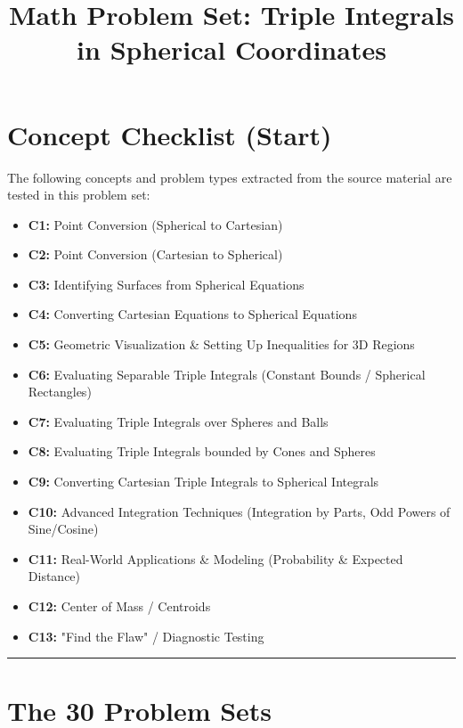\documentclass[11pt]{article}
\title{Math Problem Set: Triple Integrals in Spherical Coordinates}
\author{}
\date{}
\begin{document}
\maketitle

\section*{Concept Checklist (Start)}
The following concepts and problem types extracted from the source material are tested in this problem set:
\begin{itemize}
    \item \textbf{C1:} Point Conversion (Spherical to Cartesian)
    \item \textbf{C2:} Point Conversion (Cartesian to Spherical)
    \item \textbf{C3:} Identifying Surfaces from Spherical Equations
    \item \textbf{C4:} Converting Cartesian Equations to Spherical Equations
    \item \textbf{C5:} Geometric Visualization \& Setting Up Inequalities for 3D Regions
    \item \textbf{C6:} Evaluating Separable Triple Integrals (Constant Bounds / Spherical Rectangles)
    \item \textbf{C7:} Evaluating Triple Integrals over Spheres and Balls
    \item \textbf{C8:} Evaluating Triple Integrals bounded by Cones and Spheres
    \item \textbf{C9:} Converting Cartesian Triple Integrals to Spherical Integrals
    \item \textbf{C10:} Advanced Integration Techniques (Integration by Parts, Odd Powers of Sine/Cosine)
    \item \textbf{C11:} Real-World Applications \& Modeling (Probability \& Expected Distance)
    \item \textbf{C12:} Center of Mass / Centroids
    \item \textbf{C13:} "Find the Flaw" / Diagnostic Testing
\end{itemize}

\hrule \vspace{0.5cm}

\section*{The 30 Problem Sets}
\end{document}
